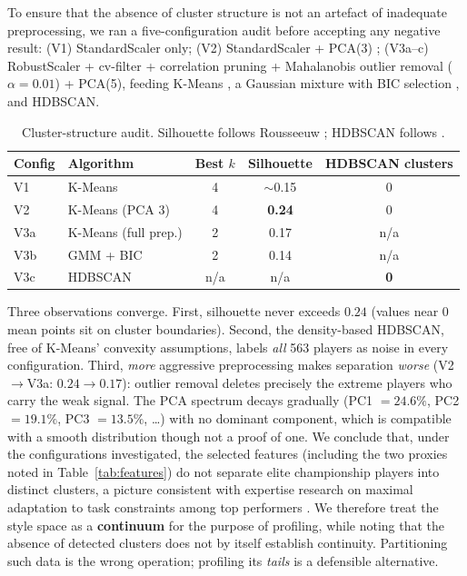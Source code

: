 \documentclass[11pt,a4paper]{article}
\begin{document}
To ensure that the absence of cluster structure is not an artefact of
inadequate preprocessing, we ran a five-configuration audit before
accepting any negative result: (V1) StandardScaler only; (V2)
StandardScaler + PCA(3) \cite{jolliffe2002principal}; (V3a--c)
RobustScaler + cv-filter + correlation pruning + Mahalanobis outlier
removal ($\alpha=0.01$) + PCA(5), feeding K-Means \cite{lloyd1982least},
a Gaussian mixture with BIC selection \cite{schwarz1978estimating}, and
HDBSCAN.

\begin{table}[h]
\centering\small
\caption{Cluster-structure audit. Silhouette follows
Rousseeuw \cite{rousseeuw1987silhouettes}; HDBSCAN follows
\cite{campello2013density}.}
\label{tab:audit}
\begin{tabular}{llccc}
\toprule
Config & Algorithm & Best $k$ & Silhouette & HDBSCAN clusters\\
\midrule
V1 & K-Means & 4 & $\sim$0.15 & 0\\
V2 & K-Means (PCA 3) & 4 & \textbf{0.24} & 0\\
V3a & K-Means (full prep.) & 2 & 0.17 & n/a\\
V3b & GMM + BIC & 2 & 0.14 & n/a\\
V3c & HDBSCAN & n/a & n/a & \textbf{0}\\
\bottomrule
\end{tabular}
\end{table}

Three observations converge. First, silhouette never exceeds $0.24$
(values near $0$ mean points sit on cluster boundaries). Second, the
density-based HDBSCAN, free of K-Means' convexity assumptions, labels \emph{all} 563 players as noise in every configuration. Third,
\emph{more} aggressive preprocessing makes separation \emph{worse}
(V2$\to$V3a: $0.24\to0.17$): outlier removal deletes precisely the
extreme players who carry the weak signal. The PCA spectrum decays
gradually (PC1 $=24.6\%$, PC2 $=19.1\%$, PC3 $=13.5\%$, \ldots) with no
dominant component, which is compatible with a smooth distribution
though not a proof of one. We conclude that, under the configurations
investigated, the selected features (including the two proxies noted
in Table~\ref{tab:features}) do not separate elite championship
players into distinct clusters, a picture consistent with expertise
research on maximal adaptation to task constraints among top performers
\cite{ericsson1996expert}. We therefore treat the style space as a
\textbf{continuum} for the purpose of profiling, while noting that the
absence of detected clusters does not by itself establish continuity.
Partitioning such data is the wrong operation; profiling its
\emph{tails} is a defensible alternative.
\end{document}
